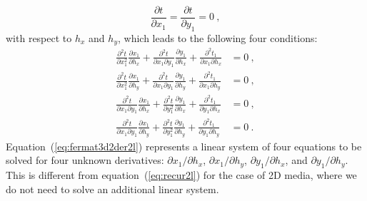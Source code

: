\begin{equation}
\label{eq:fermat3d2l}
    \frac{\partial t}{\partial x_1} = \frac{\partial t}{\partial y_1} = 0~,
\end{equation}
with respect to $h_x$ and $h_y$, which leads to the following four conditions:
\begin{align}
\label{eq:fermat3d2der2l}
\frac{\partial^2 t}{\partial x_1^2 } \frac{\partial x_1}{\partial h_x} + 
    \frac{\partial^2 t}{\partial x_1 \partial y_1 } \frac{\partial y_1}{\partial h_x} + 
    \frac{\partial^2 t_1}{\partial x_1 \partial h_x} & = 0~,\\ \nonumber
\frac{\partial^2 t}{\partial x_1^2 } \frac{\partial x_1}{\partial h_y} + 
    \frac{\partial^2 t}{\partial x_1 \partial y_1 } \frac{\partial y_1}{\partial h_y} + 
    \frac{\partial^2 t_1}{\partial x_1 \partial h_y} & = 0~,\\ \nonumber
\frac{\partial^2 t}{\partial x_1 \partial y_1 } \frac{\partial x_1}{\partial h_x}     + \frac{\partial^2 t}{\partial y_1^2 } \frac{\partial y_1}{\partial h_x} + 
    \frac{\partial^2 t_1}{\partial y_1 \partial h_x} & = 0~,\\ \nonumber
\frac{\partial^2 t}{\partial x_1 \partial y_1 } \frac{\partial x_1}{\partial h_y}     + \frac{\partial^2 t}{\partial y_1^2 } \frac{\partial y_1}{\partial h_y} + 
    \frac{\partial^2 t_1}{\partial y_1 \partial h_y} & = 0~.
\end{align}
Equation~(\ref{eq:fermat3d2der2l}) represents a linear system of four equations to be solved for four unknown derivatives: $\partial x_1/\partial h_x$, $\partial x_1/\partial h_y$, $\partial y_1/\partial h_x$, and $\partial y_1/\partial h_y$. This is different from equation~(\ref{eq:recur2l}) for the case of 2D media, where we do not need to solve an additional linear system.

